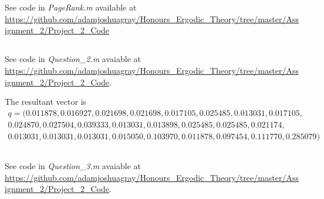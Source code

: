 \documentclass{unswmaths}
\begin{document}
\section{}
\subsection{}
See code in \emph{PageRank.m} available at \url{https://github.com/adamjoshuagray/Honours_Ergodic_Theory/tree/master/Assignment_2/Project_2_Code}

\subsection{}
See code in \emph{Question\_2.m} avaiable at \url{https://github.com/adamjoshuagray/Honours_Ergodic_Theory/tree/master/Assignment_2/Project_2_Code}. 

The resultant vector is
\begin{align*}    q =
(  0.011878,
   0.016927,
   0.021698,
   0.021698,
   0.017105,
   0.025485,
   0.013031,
   0.017105, \\
   0.024870,
   0.027504,
   0.039333,
   0.013031,
   0.013898,
   0.025485,
   0.025485,
   0.021174, \\
   0.013031,
   0.013031,
   0.013031,
   0.015050,
   0.103970,
   0.011878,
   0.097454,
   0.111770,
   0.285079
)
\end{align*}
\subsection{}
See code in \emph{Question\_3.m} avaiable at \url{https://github.com/adamjoshuagray/Honours_Ergodic_Theory/tree/master/Assignment_2/Project_2_Code}. 
\end{document}
